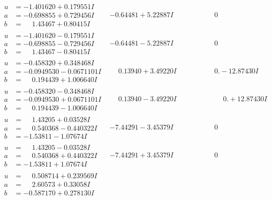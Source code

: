 \documentclass[1p]{elsarticle_modified}
\theoremstyle{definition}
\begin{document}
$$\begin{array}{c|c|c}
\begin{aligned}
u &= -1.401620 + 0.179551 I \\
a &= -0.698855 + 0.729456 I \\
b &= \phantom{-}1.43467 + 0.80415 I\end{aligned}
 & -0.64481 + 5.22887 I & \phantom{-0.000000 } 0 \\ \hline\begin{aligned}
u &= -1.401620 - 0.179551 I \\
a &= -0.698855 - 0.729456 I \\
b &= \phantom{-}1.43467 - 0.80415 I\end{aligned}
 & -0.64481 - 5.22887 I & \phantom{-0.000000 } 0 \\ \hline\begin{aligned}
u &= -0.458320 + 0.348468 I \\
a &= -0.0949530 - 0.0671101 I \\
b &= \phantom{-}0.194439 + 1.006640 I\end{aligned}
 & \phantom{-}0.13940 + 3.49220 I & \phantom{-0.000000 } 0. - 12.87430 I \\ \hline\begin{aligned}
u &= -0.458320 - 0.348468 I \\
a &= -0.0949530 + 0.0671101 I \\
b &= \phantom{-}0.194439 - 1.006640 I\end{aligned}
 & \phantom{-}0.13940 - 3.49220 I & \phantom{-0.000000 -}0. + 12.87430 I \\ \hline\begin{aligned}
u &= \phantom{-}1.43205 + 0.03528 I \\
a &= \phantom{-}0.540368 - 0.440322 I \\
b &= -1.53811 - 1.07674 I\end{aligned}
 & -7.44291 - 3.45379 I & \phantom{-0.000000 } 0 \\ \hline\begin{aligned}
u &= \phantom{-}1.43205 - 0.03528 I \\
a &= \phantom{-}0.540368 + 0.440322 I \\
b &= -1.53811 + 1.07674 I\end{aligned}
 & -7.44291 + 3.45379 I & \phantom{-0.000000 } 0 \\ \hline\begin{aligned}
u &= \phantom{-}0.508714 + 0.239569 I \\
a &= \phantom{-}2.60573 + 0.33058 I \\
b &= -0.587170 + 0.278130 I\end{aligned}

\end{array}$$
\end{document}
